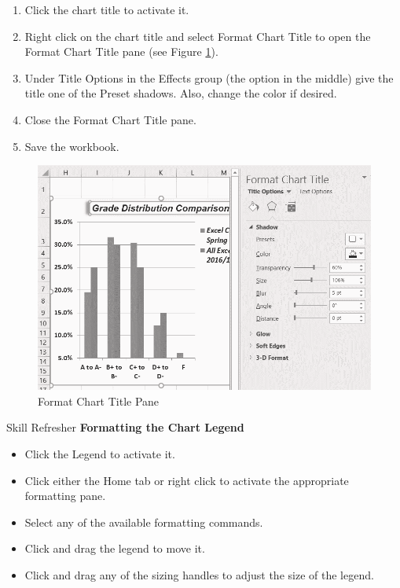 \begin{enumerate}
	\item Click the chart title to activate it.
	\item Right click on the chart title and select Format Chart Title to open the Format Chart Title pane (see Figure \ref{04:fig32}).
	\item Under Title Options in the Effects group (the option in the middle) give the title one of the Preset shadows. Also, change the color if desired.
	\item Close the Format Chart Title pane.
	\item Save the workbook.
\end{enumerate}

\begin{figure}[H]
	\centering
	\includegraphics[width=\maxwidth{.95\linewidth}]{gfx/ch04_fig32}
	\caption{Format Chart Title Pane}
	\label{04:fig32}
\end{figure}

\begin{center}
	\begin{sklbox}{Skill Refresher}
		\textbf{Formatting the Chart Legend}
		\\
		\begin{itemize}
			\setlength{\itemsep}{0pt}
			\setlength{\parskip}{0pt}
			\setlength{\parsep}{0pt}

			\item Click the Legend to activate it.
			\item Click either the Home tab or right click to activate the appropriate formatting pane.
			\item Select any of the available formatting commands.
			\item Click and drag the legend to move it.
			\item Click and drag any of the sizing handles to adjust the size of the legend.
			
		\end{itemize}
	\end{sklbox}
\end{center}

